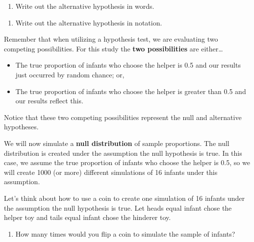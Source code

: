 \documentclass[
]{report}
\providecommand{\tightlist}{%
  \setlength{\itemsep}{0pt}\setlength{\parskip}{0pt}}
\begin{document}
\vspace{0.4in}

\begin{enumerate}
\def\labelenumi{\arabic{enumi}.}
\setcounter{enumi}{8}
\tightlist
\item
  Write out the alternative hypothesis in words.
\end{enumerate}

\vspace{1in}

\begin{enumerate}
\def\labelenumi{\arabic{enumi}.}
\setcounter{enumi}{9}
\tightlist
\item
  Write out the alternative hypothesis in notation.
\end{enumerate}

\vspace{0.5in}

Remember that when utilizing a hypothesis test, we are evaluating two competing possibilities. For this study the \textbf{two possibilities} are either\ldots{}

\begin{itemize}
\item
  The true proportion of infants who choose the helper is 0.5 and our results just occurred by random chance; or,
\item
  The true proportion of infants who choose the helper is greater than 0.5 and our results reflect this.
\end{itemize}

Notice that these two competing possibilities represent the null and alternative hypotheses.

We will now simulate a \textbf{null distribution} of sample proportions. The null distribution is created under the assumption the null hypothesis is true. In this case, we assume the true proportion of infants who choose the helper is 0.5, so we will create 1000 (or more) different simulations of 16 infants under this assumption.

Let's think about how to use a coin to create one simulation of 16 infants under the assumption the null hypothesis is true. Let heads equal infant chose the helper toy and tails equal infant chose the hinderer toy.

\begin{enumerate}
\def\labelenumi{\arabic{enumi}.}
\setcounter{enumi}{10}
\tightlist
\item
  How many times would you flip a coin to simulate the sample of infants?
\end{enumerate}
\end{document}
